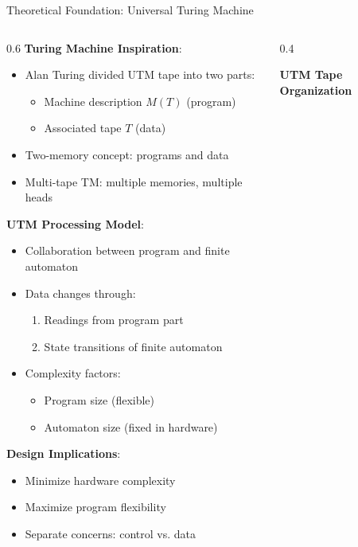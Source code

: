 \documentclass[aspectratio=169]{beamer}
\newcommand{\concept}[1]{\textbf{\color{darkblue}#1}}
\begin{document}
\begin{frame}{Theoretical Foundation: Universal Turing Machine}
\begin{columns}
\begin{column}{0.6\textwidth}
\concept{Turing Machine Inspiration}:
\begin{itemize}
\item Alan Turing divided UTM tape into two parts:
\begin{itemize}
\item Machine description $M(T)$ (program)
\item Associated tape $T$ (data)
\end{itemize}
\item Two-memory concept: programs and data
\item Multi-tape TM: multiple memories, multiple heads
\end{itemize}

\vspace{0.3cm}
\concept{UTM Processing Model}:
\begin{itemize}
\item Collaboration between program and finite automaton
\item Data changes through:
\begin{enumerate}
\item Readings from program part
\item State transitions of finite automaton
\end{enumerate}
\item Complexity factors:
\begin{itemize}
\item Program size (flexible)
\item Automaton size (fixed in hardware)
\end{itemize}
\end{itemize}

\vspace{0.3cm}
\concept{Design Implications}:
\begin{itemize}
\item Minimize hardware complexity
\item Maximize program flexibility
\item Separate concerns: control vs. data
\end{itemize}
\end{column}
\begin{column}{0.4\textwidth}
\begin{center}
\textbf{UTM Tape Organization}
\vspace{0.3cm}


\end{center}
\end{column}
\end{columns}
\end{frame}
\end{document}
